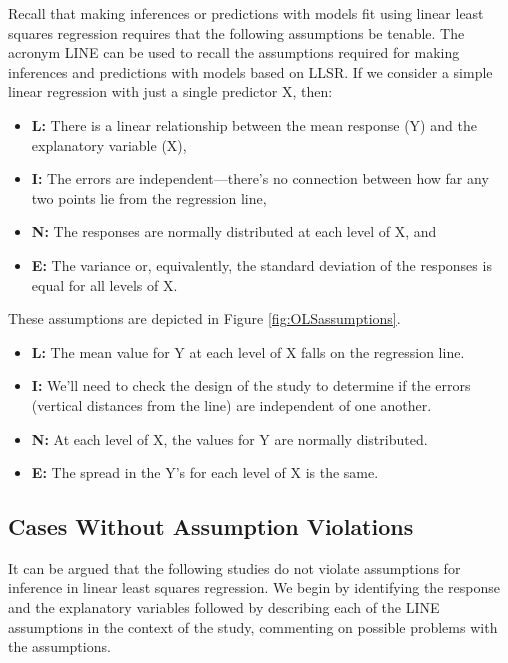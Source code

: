 \documentclass[
]{krantz}
\providecommand{\tightlist}{%
  \setlength{\itemsep}{0pt}\setlength{\parskip}{0pt}}
\begin{document}
Recall that making inferences or predictions with models fit using linear least squares regression  requires that the following assumptions be tenable. The acronym LINE can be used to recall the assumptions required for making inferences and predictions with models based on LLSR. If we consider a simple linear regression  with just a single predictor X, then:

\begin{itemize}
\tightlist
\item
  \textbf{L:} There is a linear relationship between the mean response (Y) and the explanatory variable (X),
\item
  \textbf{I:} The errors are independent---there's no connection between how far any two points lie from the regression line,
\item
  \textbf{N:} The responses are normally distributed at each level of X, and
\item
  \textbf{E:} The variance or, equivalently, the standard deviation of the responses is equal for all levels of X.
\end{itemize}

These assumptions are depicted in Figure \ref{fig:OLSassumptions}.

\begin{itemize}
\tightlist
\item
  \textbf{L:} The mean value for Y at each level of X falls on the regression line.
\item
  \textbf{I:} We'll need to check the design of the study to determine if the errors (vertical distances from the line) are independent of one another.
\item
  \textbf{N:} At each level of X, the values for Y are normally distributed.
\item
  \textbf{E:} The spread in the Y's for each level of X is the same.
\end{itemize}

\hypertarget{cases-without-assumption-violations}{%
\subsection{Cases Without Assumption Violations}\label{cases-without-assumption-violations}}

It can be argued that the following studies do not violate assumptions for inference in linear least squares regression. We begin by identifying the response and the explanatory variables followed by describing each of the LINE assumptions in the context of the study, commenting on possible problems with the assumptions.
\end{document}
